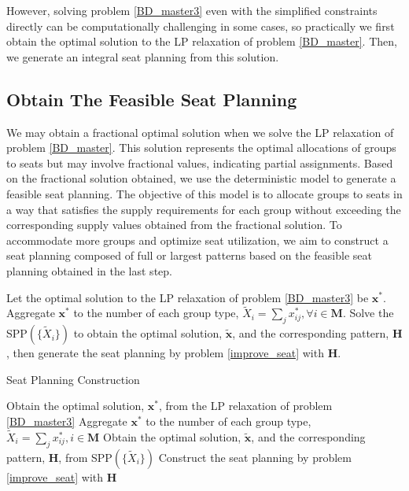 However, solving problem \eqref{BD_master3} even with the simplified constraints directly can be computationally challenging in some cases, so practically we first obtain the optimal solution to the LP relaxation of problem \eqref{BD_master}. Then, we generate an integral seat planning from this solution.

\subsection{Obtain The Feasible Seat Planning}\label{seat_assignment}
We may obtain a fractional optimal solution when we solve the LP relaxation of problem \eqref{BD_master}. This solution represents the optimal allocations of groups to seats but may involve fractional values, indicating partial assignments. Based on the fractional solution obtained, we use the deterministic model to generate a feasible seat planning. The objective of this model is to allocate groups to seats in a way that satisfies the supply requirements for each group without exceeding the corresponding supply values obtained from the fractional solution. To accommodate more groups and optimize seat utilization, we aim to construct a seat planning composed of full or largest patterns based on the feasible seat planning obtained in the last step. 


Let the optimal solution to the LP relaxation of problem \eqref{BD_master3} be $\mathbf{x}^{*}$. Aggregate $\mathbf{x}^{*}$ to the number of each group type, $\tilde{X}_{i} =\sum_{j} x^{*}_{ij}, \forall i \in \mathbf{M}$. Solve the SPP$(\{\tilde{X}_{i}\})$ to obtain the optimal solution, $\mathbf{\tilde{x}}$, and the corresponding pattern, $\bm{H}$, then generate the seat planning by problem \eqref{improve_seat} with $\bm{H}$.


\begin{algorithm}
  \caption{Seat Planning Construction}\label{seat_construction}
    {Obtain the optimal solution, $\mathbf{x}^{*}$, from the LP relaxation of problem \eqref{BD_master3}\;}
    {Aggregate $\mathbf{x}^{*}$ to the number of each group type, $\tilde{X}_{i} = \sum_{j} x^{*}_{ij}, i \in \mathbf{M}$\;}
    {Obtain the optimal solution, $\tilde{\mathbf{x}}$, and the corresponding pattern, $\bm{H}$, from SPP$(\{\tilde{X}_{i}\})$\;}
    {Construct the seat planning by problem \eqref{improve_seat} with $\bm{H}$\;}
\end{algorithm}
